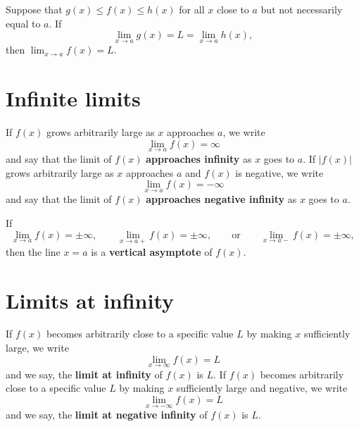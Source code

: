 \documentclass{ximera}
\begin{document}
\begin{theorem}
Suppose that $g(x) \le f(x) \le h(x)$ for all $x$
close to $a$ but not necessarily equal to $a$. If
\[
\lim_{x\to a} g(x) = L = \lim_{x\to a} h(x),
\]
then $\lim_{x\to a} f(x) = L$.
\end{theorem}






\section{Infinite limits}






\begin{definition}
If $f(x)$ grows arbitrarily large as $x$ approaches $a$, we write
\[
\lim_{x\to a} f(x) = \infty
\]
and say that the limit of $f(x)$ \textbf{approaches infinity} as $x$
goes to $a$.
If $|f(x)|$ grows arbitrarily large as $x$ approaches $a$ and $f(x)$ is
negative, we write
\[
\lim_{x\to a} f(x) = -\infty
\]
and say that the limit of $f(x)$ \textbf{approaches negative infinity}
as $x$ goes to $a$.
\end{definition}




\begin{definition}
If
\[
\lim_{x\to a} f(x) = \pm\infty, \qquad \lim_{x\to a+} f(x) = \pm\infty, \qquad\text{or}\qquad \lim_{x\to a-} f(x) = \pm\infty,
\]
then the line $x=a$ is a \textbf{vertical asymptote} of $f(x)$.
\end{definition}






\section{Limits at infinity}







\begin{definition}
If $f(x)$ becomes arbitrarily close to a specific value $L$ by making
$x$ sufficiently large, we write
\[
\lim_{x\to \infty} f(x) = L
\]
and we say, the \textbf{limit at infinity} of $f(x)$ is $L$.
If $f(x)$ becomes
arbitrarily close to a specific value $L$ by making $x$ sufficiently
large and negative, we write
\[
\lim_{x\to -\infty} f(x) = L
\]
and we say, the \textbf{limit at negative infinity} of $f(x)$ is $L$.
\end{definition}
\end{document}
